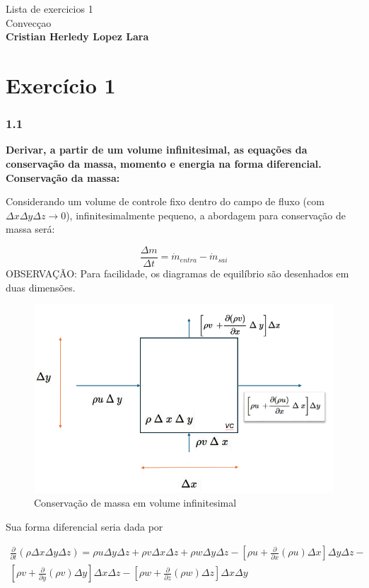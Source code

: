 \documentclass[]{article}
\title{}
\author{}
\begin{document}
\begin{center}
	{\tiny {\normalsize {\large Lista de exercicios 1\\
Convecçao\\
\textbf{Cristian Herledy Lopez Lara}}}}
\end{center}

\section*{Exercício 1}
\subsubsection*{1.1}

\textbf{Derivar, a partir de um volume infinitesimal, as equações da conservação da massa, momento e energia na forma diferencial.} \\


\textbf{Conservação da massa:} 

Considerando um volume de controle fixo dentro do campo de fluxo (com $\Delta x \Delta y  \Delta z \rightarrow 0 $), infinitesimalmente pequeno, a abordagem para conservação de massa será:

\begin{equation}
	\frac{\Delta m}{\Delta t} = \dot{m}_{entra} - \dot{m}_{sai}
\end{equation}
OBSERVAÇÃO: Para facilidade, os diagramas de equilíbrio são desenhados em duas dimensões.

\begin{figure}[H]
	\centering
	\includegraphics[width=.65\textwidth]{Figures/1_1.png}
	\caption{Conservação de massa em volume infinitesimal}
\end{figure}


Sua forma diferencial seria dada por

\begin{equation}
	\begin{aligned}
		\frac{\partial}{\partial t} (\rho \Delta x \Delta y \Delta z) = \rho u\Delta y\Delta z + \rho v\Delta x\Delta z + \rho w\Delta y\Delta z - [\rho u +	\frac{\partial}{\partial x}(\rho u)\Delta x]\Delta y\Delta z - \\ [\rho v +	\frac{\partial}{\partial y}(\rho v)\Delta y]\Delta x\Delta z - [\rho w +	\frac{\partial}{\partial z}(\rho w)\Delta z]\Delta x\Delta y
	\end{aligned}
\end{equation}
\end{document}

